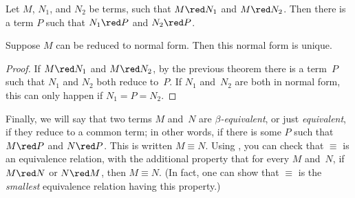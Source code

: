 \documentclass[../../../include/open-logic-section]{subfiles}
\begin{document}

\begin{thm}
Let $M$, $N_1$, and $N_2$ be terms, such that $M \red N_1$ and $M \red
N_2$. Then there is a term $P$ such that $N_1 \red P$ and $N_2 \red P$.
\end{thm}

\begin{cor}
Suppose $M$ can be reduced to normal form. Then this normal form is
unique.
\end{cor}

\begin{proof}
If $M \red N_1$ and $M \red N_2$, by the previous theorem there is a
term~$P$ such that $N_1$ and $N_2$ both reduce to~$P$. If $N_1$
and~$N_2$ are both in normal form, this can only happen if $N_1 = P =
N_2$.
\end{proof}

Finally, we will say that two terms $M$ and~$N$ are
\emph{$\beta$-equivalent}, or just \emph{equivalent}, if they reduce
to a common term; in other words, if there is some $P$ such that $M
\red P$ and $N \red P$. This is written $M \equiv N$. Using
, you can check that $\equiv$ is an
equivalence relation, with the additional property that for every $M$
and~$N$, if $M \red N$ or $N \red M$, then $M \equiv N$. (In fact, one
can show that $\equiv$ is the \emph{smallest} equivalence relation
having this property.)
\end{document}
